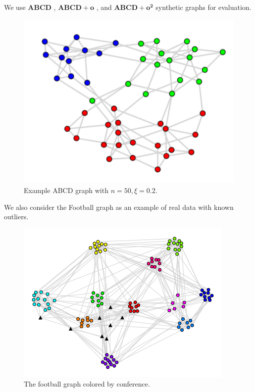 \documentclass{beamer}
\begin{document}
\begin{frame}{}
    We use $\mathbf{ABCD}$ \citep{abcd}, $\mathbf{ABCD+o}$ \citep{abcdo}, and $\mathbf{ABCD+o^2}$ \citep{abcdoo} synthetic graphs for evaluation.
    \begin{figure}
        \centering
        \includegraphics[height=0.6\textheight]{figures/abcd.png}
        \caption{Example ABCD graph with $n=50, \xi=0.2$.}
    \end{figure}
\end{frame}
\begin{frame}{}
    We also consider the Football graph \citep{football} as an example of real data with known outliers.
    \begin{figure}
        \centering
        \includegraphics[height=0.6\textheight]{figures/foot1b.png}
        \caption{The football graph colored by conference.}
    \end{figure}
\end{frame}
\end{document}

